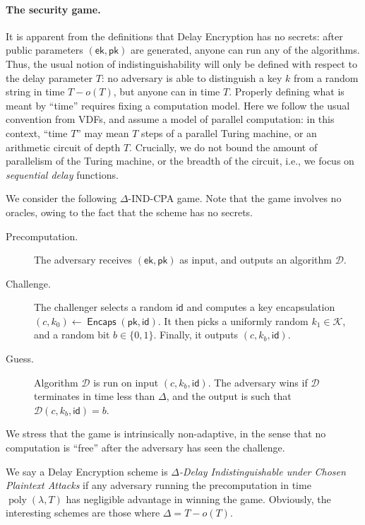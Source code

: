 \documentclass{llncs}
\DeclareMathOperator{\poly}{poly}
\DeclareMathOperator{\Encaps}{\mathsf{Encaps}}
\newcommand{\ek}{\mathsf{ek}}
\newcommand{\pk}{\mathsf{pk}}
\newcommand{\id}{\mathsf{id}}
\newcommand{\keyspace}{\mathcal{K}}
\begin{document}
\paragraph{The security game.} It is apparent from the definitions
that Delay Encryption has no secrets: after public parameters $(\ek,\pk)$
are generated, anyone can run any of the algorithms. %
Thus, the usual notion of indistinguishability will only be defined
with respect to the delay parameter $T$: no adversary is able to
distinguish a key $k$ from a random string in time $T-o(T)$, but
anyone can in time $T$. %
Properly defining what is meant by ``time'' requires fixing a
computation model. %
Here we follow the usual convention from VDFs, and assume a model of
parallel computation: in this context, ``time $T$'' may mean $T$ steps
of a parallel Turing machine, or an arithmetic circuit of depth $T$. %
Crucially, we do not bound the amount of parallelism of the Turing
machine, or the breadth of the circuit, i.e., we focus on
\emph{sequential delay} functions.

We consider the following $\Delta$-IND-CPA game. %
Note that the game involves no oracles, owing to the fact that the
scheme has no secrets. %
%
\begin{description}
\item[Precomputation.] The adversary receives $(\ek,\pk)$ as input, and
  outputs an algorithm $\mathcal{D}$. %
\item[Challenge.] The challenger selects a random $\id$ and computes
  a key encapsulation $(c,k_0)\gets\Encaps(\pk,\id)$. %
  It then picks a uniformly random $k_1\in\keyspace$, and a random bit
  $b\in\{0,1\}$. %
  Finally, it outputs $(c,k_b,\id)$.
\item[Guess.]  Algorithm $\mathcal{D}$ is run on input
  $(c,k_b,\id)$. %
  The adversary wins if $\mathcal{D}$ terminates in time less than
  $\Delta$, and the output is such that $\mathcal{D}(c,k_b,\id) = b$.
\end{description}

We stress that the game is intrinsically non-adaptive, in the sense
that no computation is ``free'' after the adversary has seen the
challenge.

We say a Delay Encryption scheme is \emph{$\Delta$-Delay
  Indistinguishable under Chosen Plaintext Attacks} if any
adversary running the precomputation in time
$\poly(\lambda,T)$ has negligible advantage in winning the game. %
Obviously, the interesting schemes are those where $\Delta = T-o(T)$.
\end{document}

